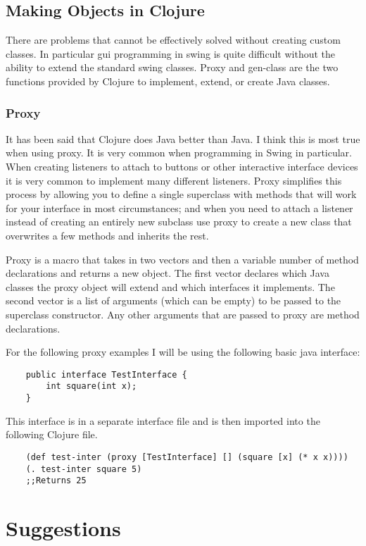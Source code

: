 \documentclass[12pt]{article}
\begin{document}
	\subsection{Making Objects in Clojure}
	There are problems that cannot be effectively solved without creating custom classes. In particular gui programming in swing is quite difficult without the ability to extend the standard swing classes. Proxy and gen-class are the two functions provided by Clojure to implement, extend, or create Java classes. 
	\subsubsection{Proxy}
	It has been said that Clojure does Java better than Java\cite{halloway:better}. I think this is most true when using proxy. It is very common when programming in Swing in particular. When creating listeners to attach to buttons or other interactive interface devices it is very common to implement many different listeners. Proxy simplifies this process by allowing you to define a single superclass with methods that will work for your interface in most circumstances; and when you need to attach a listener instead of creating an entirely new subclass use proxy to create a new class that overwrites a few methods and inherits the rest. 
	
	Proxy is a macro that takes in two vectors and then a variable number of method declarations and returns a new object. The first vector declares which Java classes the proxy object will extend and which interfaces it implements. The second vector is a list of arguments (which can be empty) to be passed to the superclass constructor. Any other arguments that are passed to proxy are method declarations\cite{cloj:interop}. 
	
	For the following proxy examples I will be using the following basic java interface:
	
	\begin{verbatim}
	public interface TestInterface {
		int square(int x);
	}
	\end{verbatim}
	This interface is in a separate interface file and is then imported into the following Clojure file.
	\begin{verbatim}
	(def test-inter (proxy [TestInterface] [] (square [x] (* x x))))
	(. test-inter square 5)
	;;Returns 25
	\end{verbatim}
	
	
\section{Suggestions}\label{sec:sugg}
\end{document}
